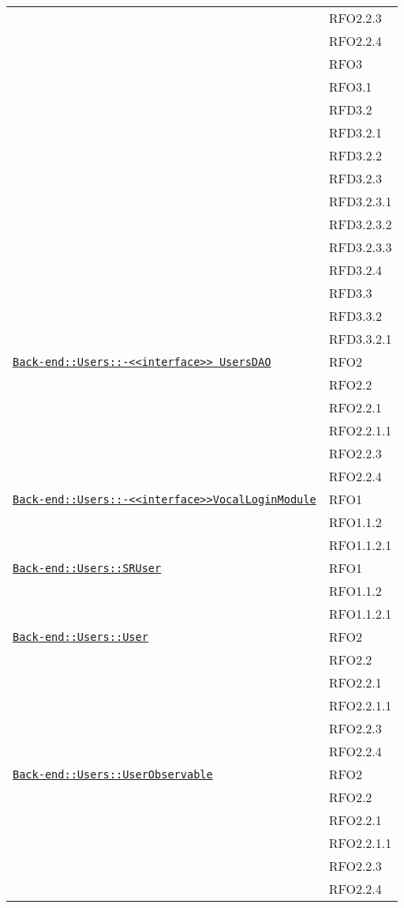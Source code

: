 \begin{longtable}{|>{\centering}m{10cm}|m{3cm}<{\centering}|}
& RFO2.2.3\\
& RFO2.2.4\\
& RFO3\\
& RFO3.1\\
& RFD3.2\\
& RFD3.2.1\\
& RFD3.2.2\\
& RFD3.2.3\\
& RFD3.2.3.1\\
& RFD3.2.3.2\\
& RFD3.2.3.3\\
& RFD3.2.4\\
& RFD3.3\\
& RFD3.3.2\\
& RFD3.3.2.1\\ \hline

\hyperref[Back-end::Users::<<interface>> UsersDAO]{\texttt{Back-end::Users::-\linebreak <<interface>> UsersDAO}} & RFO2\\
& RFO2.2\\
& RFO2.2.1\\
& RFO2.2.1.1\\
& RFO2.2.3\\
& RFO2.2.4\\ \hline

\hyperref[Back-end::Users::<<interface>>VocalLoginModule]{\texttt{Back-end::Users::-\linebreak <<interface>>VocalLoginModule}} & RFO1\\
& RFO1.1.2\\
& RFO1.1.2.1\\ \hline

\hyperref[Back-end::Users::SRUser]{\texttt{Back-end::Users::SRUser}} & RFO1\\
& RFO1.1.2\\
& RFO1.1.2.1\\ \hline

\hyperref[Back-end::Users::User]{\texttt{Back-end::Users::User}} & RFO2\\
& RFO2.2\\
& RFO2.2.1\\
& RFO2.2.1.1\\
& RFO2.2.3\\
& RFO2.2.4\\ \hline

\hyperref[Back-end::Users::UserObservable]{\texttt{Back-end::Users::UserObservable}} & RFO2\\
& RFO2.2\\
& RFO2.2.1\\
& RFO2.2.1.1\\
& RFO2.2.3\\
& RFO2.2.4\\ \hline


\end{longtable}
